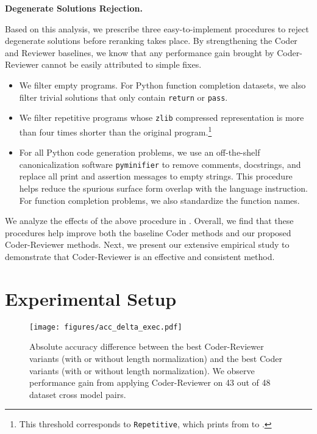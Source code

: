 \documentclass[nohyperref]{article}
\theoremstyle{plain}
\theoremstyle{definition}
\theoremstyle{remark}
\renewcommand{\paragraph}[1]{
     \textbf{#1} 
 }
\begin{document}
\paragraph{Degenerate Solutions Rejection.}
Based on this analysis, we prescribe three easy-to-implement procedures to reject degenerate solutions before reranking takes place.
By strengthening the Coder and Reviewer baselines, we know that any performance gain brought by Coder-Reviewer cannot be easily attributed to simple fixes.
\begin{itemize}
    \item We filter empty programs. For Python function completion datasets, we also filter trivial solutions that only contain \texttt{return} or \texttt{pass}.
    \item We filter repetitive programs whose \texttt{zlib} compressed representation is more than four times shorter than the original program.\footnote{This threshold corresponds to \texttt{Repetitive}, which prints from  to .}
    \item For all Python code generation problems, we use an off-the-shelf canonicalization software \texttt{pyminifier} to remove comments, docstrings, and replace all print and assertion messages to empty strings. This procedure helps reduce the spurious surface form overlap with the language instruction. For function completion problems, we also standardize the function names. 
\end{itemize}

We analyze the effects of the above procedure in .
Overall, we find that these procedures help improve both the baseline Coder methods and our proposed Coder-Reviewer methods. 
Next, we present our extensive empirical study to demonstrate that Coder-Reviewer is an effective and consistent method.

 \section{Experimental Setup}
\begin{figure*}[ht]
     \centering
     \texttt{[image: figures/acc\_delta\_exec.pdf]}
     \caption{Absolute accuracy difference between the best Coder-Reviewer variants (with or without length normalization) and the best Coder variants (with or without length normalization). We observe performance gain from applying Coder-Reviewer on 43 out of 48 dataset cross model pairs.}
     \label{fig:acc_delta}
     \vspace{-13pt}
\end{figure*}
\end{document}
